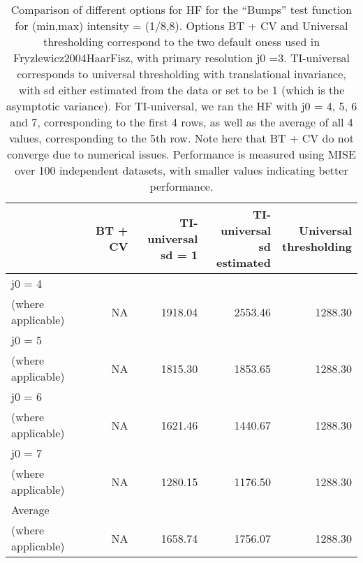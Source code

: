 \documentclass[12pt]{article}
\begin{document}
\begin{table}[ht]
\centering
\begin{tabular}{lrrrr}
  \hline
 & BT + CV & \pbox{20cm}{TI-universal \\ sd = 1} & \pbox{20cm}{TI-universal \\ sd estimated} & \pbox{20cm}{Universal \\ thresholding} \\ 
  \hline
j0 = 4 \\
 (where applicable) & NA & 1918.04 & 2553.46 & 1288.30 \\ 
  j0 = 5 \\
 (where applicable) & NA & 1815.30 & 1853.65 & 1288.30 \\ 
  j0 = 6 \\
 (where applicable) & NA & 1621.46 & 1440.67 & 1288.30 \\ 
  j0 = 7 \\
 (where applicable) & NA & 1280.15 & 1176.50 & 1288.30 \\ 
  Average \\
 (where applicable) & NA & 1658.74 & 1756.07 & 1288.30 \\ 
   \hline
\end{tabular}
\caption{Comparison of different options for HF for the ``Bumps'' test function for (min,max) intensity = (1/8,8). Options BT + CV and Universal thresholding correspond to the two default oness used in {Fryzlewicz2004HaarFisz}, with primary resolution j0 =3. TI-universal corresponds to universal thresholding with translational invariance, with sd either estimated from the data or set to be 1 (which is the asymptotic variance). For TI-universal, we ran the HF with j0 = 4, 5, 6 and 7, corresponding to the first 4 rows, as well as the average of all 4 values, corresponding to the 5th row. Note here that BT + CV do not converge due to numerical issues. Performance is measured using MISE over 100 independent datasets, with smaller values indicating better performance.} 
\label{table:pois_hf_bump_8}
\end{table}
\end{document}
